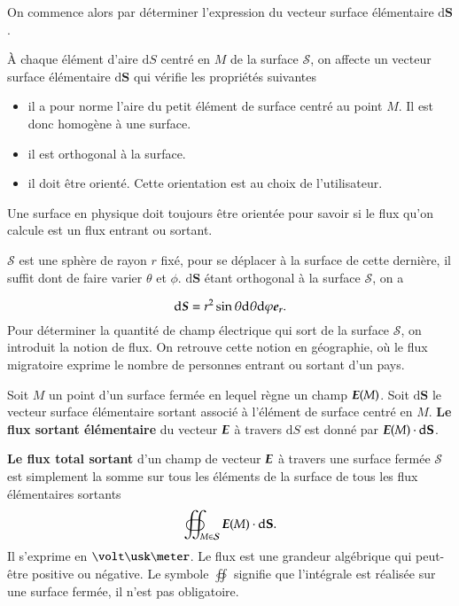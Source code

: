 On commence alors par déterminer 
l'expression du vecteur surface élémentaire $\mathrm{d}\mathbf{S}$. 

\begin{defn}
	À chaque élément d'aire $\mathrm{d}S$ centré en $M$ de la surface $\mathcal{S}$, 
	on  affecte un vecteur surface élémentaire $\mathrm{d}\mathbf{S}$ 
	qui vérifie les propriétés suivantes
	\begin{itemize}
		\item il a pour norme l'aire du petit élément de surface centré 
		  au point $M$. Il est donc homogène à une surface.
		\item il est orthogonal à la surface.
		\item il doit être orienté. Cette orientation est au choix de 
		  l'utilisateur.
	\end{itemize}
\end{defn}

\begin{attention}
	Une surface en physique doit toujours être orientée pour savoir
	si le flux qu'on calcule est un flux entrant ou sortant.
\end{attention}

$\mathcal{S}$ est une sphère de rayon $r$ fixé, pour se déplacer à la surface 
de cette dernière, 
il suffit dont de faire varier $\theta$ et $\phi$. $\mathrm{d}\mathbf{S}$ 
étant orthogonal à la surface $\mathcal{S}$, on a

\begin{equation*}
	\ds = r^2 \sin \theta \dtheta \dphi \er.
\end{equation*}
Pour déterminer la quantité de champ électrique qui sort de la surface 
$\mathcal{S}$, on introduit la notion de flux. On retrouve cette notion en géographie,
 où le flux migratoire exprime le nombre de personnes entrant ou sortant d'un 
 pays.

\begin{defn}
	Soit $M$ un point d'un surface fermée en lequel règne un champ $\vece(M)$.
	Soit $\mathrm{d}\mathbf{S}$ le vecteur surface élémentaire sortant associé
	à l'élément de surface centré en $M$. \textbf{Le flux sortant élémentaire} du 
	vecteur $\vece$ à travers $\mathrm{d}S$ est donné par
	$\vece(M) \cdot \mathrm{d}\mathbf{S}$.

	\textbf{Le flux total sortant} d'un champ de vecteur $\vece$ à travers 
	une surface fermée
	$\mathcal{S}$ est simplement la somme sur tous les éléments de la surface de tous
	les flux élémentaires sortants
	\begin{equation}
		\oiint_{M \in \mathcal{S}} \vece(M) \cdot \mathrm{d}\mathbf{S}.
	\end{equation}
	Il s'exprime en $\volt \usk \meter$. Le flux est une grandeur algébrique
	qui peut-être positive ou négative. Le symbole $\oiint$ signifie que
	l'intégrale est réalisée sur une surface fermée, il n'est pas obligatoire.
\end{defn}

